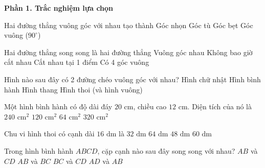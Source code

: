 \textbf{Phần 1. Trắc nghiệm lựa chọn}

\begin{ex} %
Hai đường thẳng vuông góc với nhau tạo thành
\choice
{Góc nhọn}
{Góc tù}
{Góc bẹt}
{\True Góc vuông ($90^\circ$)}
\end{ex}

\begin{ex} %
Hai đường thẳng song song là hai đường thẳng
\choice
{Vuông góc nhau}
{\True Không bao giờ cắt nhau}
{Cắt nhau tại 1 điểm}
{Có 4 góc vuông}
\end{ex}

\begin{ex} %
Hình nào sau đây có 2 đường chéo vuông góc với nhau?
\choice
{Hình chữ nhật}
{Hình bình hành}
{Hình thang}
{\True Hình thoi (và hình vuông)}
\end{ex}

\begin{ex} %
Một hình bình hành có độ dài đáy $20\text{ cm}$, chiều cao $12\text{ cm}$. Diện tích của nó là
\choice
{\True $240\text{ cm}^2$}
{$120\text{ cm}^2$}
{$64\text{ cm}^2$}
{$320\text{ cm}^2$}
\end{ex}

\begin{ex} %
Chu vi hình thoi có cạnh dài $16\text{ dm}$ là
\choice
{$32\text{ dm}$}
{\True $64\text{ dm}$}
{$48\text{ dm}$}
{$60\text{ dm}$}
\end{ex}

\begin{ex} %
Trong hình bình hành $ABCD$, cặp cạnh nào sau đây song song với nhau?
\choice
{\True $AB$ và $CD$}
{$AB$ và $BC$}
{$BC$ và $CD$}
{$AD$ và $AB$}
\end{ex}

